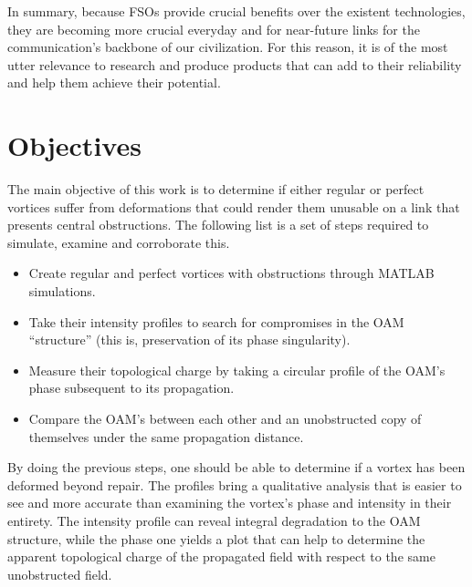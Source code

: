 In summary, because FSOs provide crucial benefits over the existent technologies, they are becoming more crucial everyday and for near-future links for the communication's backbone of our civilization. For this reason, it is of the most utter relevance to research and produce products that can add to their reliability and help them achieve their potential.

\section{Objectives}
\label{c1:Objectives}
The main objective of this work is to determine if either regular or perfect vortices suffer from deformations that could render them unusable on a link that presents central obstructions. The following list is a set of steps required to simulate, examine and corroborate this.

\begin{itemize}
  \item Create regular and perfect vortices with obstructions through MATLAB simulations.
  \item Take their intensity profiles to search for compromises in the OAM ``structure'' (this is, preservation of its phase singularity).
  \item Measure their topological charge by taking a circular profile of the OAM's phase subsequent to its propagation.
  \item Compare the OAM's between each other and an unobstructed copy of themselves under the same propagation distance.
\end{itemize}

By doing the previous steps, one should be able to determine if a vortex has been deformed beyond repair. The profiles bring a qualitative analysis that is easier to see and more accurate than examining the vortex's phase and intensity in their entirety. The intensity profile can reveal integral degradation to the OAM structure, while the phase one yields a plot that can help to determine the apparent topological charge of the propagated field with respect to the same unobstructed field. 


